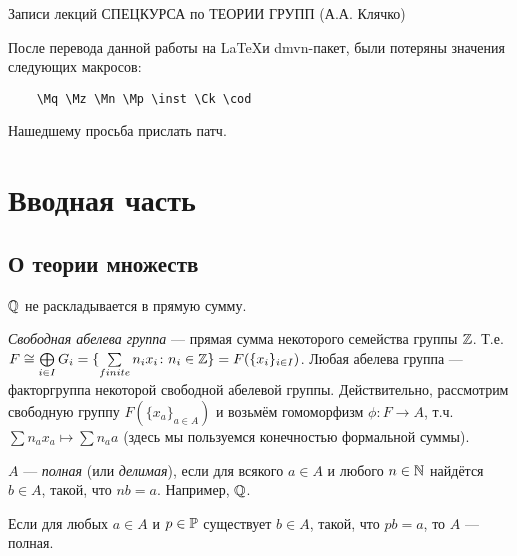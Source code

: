 \documentclass[10pt,a4paper]{article}
\newcommand{\inst}{}
\begin{document}
\begin{center}{\sf Записи лекций СПЕЦКУРСА по ТЕОРИИ ГРУПП (А.А.
Клячко)}
\end{center}
\begin{petit}
  После перевода данной работы на \LaTeX и dmvn-пакет,
  были потеряны значения следующих макросов:
  \begin{verbatim}
    \Mq \Mz \Mn \Mp \inst \Ck \cod
   \end{verbatim}
  Нашедшему просьба прислать патч.
\end{petit}

\section{Вводная часть}
\subsection{О теории множеств}

\begin{problem}$\mathbb Q$ не раскладывается в прямую
сумму.
\end{problem}

\emph{Свободная абелева группа}
--- прямая сумма некоторого семейства группы $\mathbb Z$. Т.е. $F\cong
\bigoplus\limits_{i\in I}G_i=\{\sum\limits_{finite}n_i x_i\colon
n_i\in\mathbb Z\}=F(\{x_i\}_{i\in I})$. Любая абелева группа
--- факторгруппа некоторой свободной абелевой группы.
Действительно, рассмотрим свободную группу $F(\{x_a\}_{a\in A})$ и
возьмём гомоморфизм $\phi\colon F\rightarrow A$, т.ч. $\sum n_a
x_a\mapsto\sum n_a a$ (здесь мы пользуемся конечностью формальной
суммы).

$A$ ---  \emph{полная} (или
\emph{делимая}), если для всякого $a\in A$ и
любого $n\in\mathbb N$ найдётся $b\in A$, такой, что $nb=a$. Например,
$\mathbb Q$.

\begin{stm} Если для любых $a\in A$ и
$p\in \mathbb P$ существует $b\in A$, такой, что $pb=a$, то $A$ ---
полная.
\end{stm}
\end{document}
